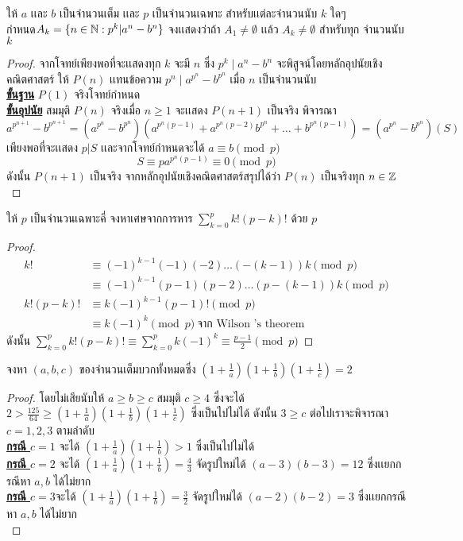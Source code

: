 \documentclass[a4paper,12pt]{scrartcl}
\begin{document}
	\begin{example}
		ให้ $a$ เเละ $b$ เป็นจำนวนเต็ม เเละ $p$   เป็นจำนวนเฉพาะ สำหรับเเต่ละจำนวนนับ $k$ ใดๆ\\ กำหนด$ A_k = \{ n \in \mathbb N : p^k | a^n-b^n \}$ จงเเสดงว่าถ้า $A_1 \neq \emptyset$ เเล้ว $A_k \neq \emptyset$ สำหรับทุก จำนวนนับ $k$
	\end{example}
	\begin{proof}
		จากโจทย์เพียงพอที่จะเเสดงทุก $k$ จะมี $n$ ซึ่ง $p^k \mid a^n-b^n$ จะพิสูจน์โดยหลักอุปนัยเชิงคณิตศาสตร์ ให้ $P(n)$ เเทนข้อความ $p^n \mid a^{p^n}-b^{p^n}$ เมื่อ $n$ เป็นจำนวนนับ \\
		\underline{\textbf{ขั้นฐาน}} $P(1)$ จริงโจทย์กำหนด \\
		\underline{\textbf{ขั้นอุปนัย}} สมมุติ $P(n)$ จริงเมื่อ $n \ge 1$ จะเเสดง $P(n+1)$ เป็นจริง พิจารณา \[a^{p^{n+1}}-b^{p^{n+1}} = (a^{p^n}-b^{p^n})(a^{p^n(p-1)}+a^{p^n(p-2)}b^{p^n} + \dots + b^{p^n(p-1)}) = (a^{p^n}-b^{p^n})(S)
		\]
		เพียงพอที่จะเเสดง $p|S$ เเละจากโจทย์กำหนดจะได้ $a \equiv b \pmod p$
		\[	S \equiv pa^{p^{n}(p-1)} \equiv 0 \pmod p \] 
		ดังนั้น $P(n+1)$ เป็นจริง จากหลักอุปนัยเชิงคณิตศาสตร์สรุปได้ว่า $P(n)$ เป็นจริงทุก $n \in \mathbb Z$
	\end{proof}
	\begin{example}
		ให้ $p$ เป็นจำนวนเฉพาะคี่ จงหาเศษจากการหาร $ \displaystyle \sum_{k=0}^{p}k!(p-k)!$ ด้วย $p$
	\end{example}
\begin{proof}
	\begin{align*}
		k! &\equiv (-1)^{k-1} (-1)(-2) \dots (-(k-1))k \pmod p \\
		& \equiv (-1)^{k-1} (p-1)(p-2) \dots (p-(k-1))k  \pmod p \\
		k!(p-k)! & \equiv k(-1)^{k-1} (p-1)! \pmod p \\
		& \equiv k(-1)^k \pmod p  \: \textrm{จาก Wilson 's theorem}
	\end{align*}
ดังนั้น $\sum_{k=0}^{p}k!(p-k)! \equiv \sum_{k=0}^{p} k(-1)^k \equiv \frac{p-1}{2} \pmod p$ 
\end{proof}

	\begin{example}
		จงหา $(a,b,c)$ ของจำนวนเต็มบวกทั้งหมดซึ่ง $(1+\frac{1}{a})(1+\frac{1}{b})(1+\frac{1}{c}) = 2$
	\end{example}
\begin{proof}
	โดยไม่เสียนับให้ $a \ge b \ge c$ สมมุติ $c \ge 4$ ซึ่งจะได้ 
	$ 2>\frac{125}{64} \ge(1+\frac{1}{a})(1+\frac{1}{b})(1+\frac{1}{c})$ ซึ่งเป็นไปไม่ได้ ดังนั้น  $3 \ge c$ ต่อไปเราจะพิจารณา $c=1,2,3$ ตามลำดับ \\
	\underline{\textbf{กรณี $c=1$}} จะได้ $(1+\frac{1}{a})(1+\frac{1}{b}) > 1$ ซึ่งเป็นไปไม่ได้ \\
	\underline{\textbf{กรณี $c=2$}} จะได้ $(1+\frac{1}{a})(1+\frac{1}{b}) = \frac{4}{3}$ จัดรูปใหม่ได้ $(a-3)(b-3) = 12$ ซึ่งเเยกกรณีหา $a,b$ ได้ไม่ยาก \\
	\underline{\textbf{กรณี $c=3$}}จะได้ $(1+\frac{1}{a})(1+\frac{1}{b}) = \frac{3}{2}$ จัดรูปใหม่ได้ $(a-2)(b-2) = 3$ ซึ่งเเยกกรณีหา $a,b$ ได้ไม่ยาก \\
	
\end{proof}
\end{document}
